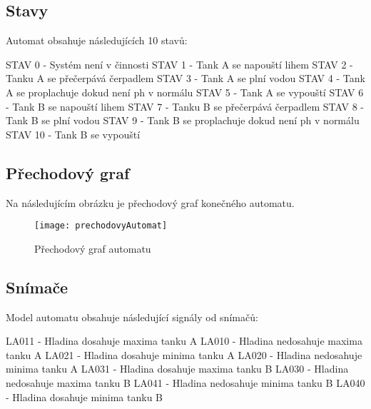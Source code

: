 \documentclass[12pt, a4paper]{article}
\begin{document}
\subsection{Stavy}
Automat obsahuje následujících 10 stavů:

STAV 0 - Systém není v činnosti \newline 
STAV 1 - Tank A se napouští lihem \newline 
STAV 2 - Tanku A se přečerpává čerpadlem \newline 
STAV 3 - Tank A se plní vodou \newline 
STAV 4 - Tank A se proplachuje dokud není ph v normálu \newline 
STAV 5 - Tank A se vypouští \newline 
STAV 6 - Tank B se napouští lihem \newline 
STAV 7 - Tanku B se přečerpává čerpadlem \newline 
STAV 8 - Tank B se plní vodou \newline 
STAV 9 - Tank B se proplachuje dokud není ph v normálu \newline 
STAV 10 - Tank B se vypouští 

\newpage
\subsection{Přechodový graf}
Na následujícím obrázku je přechodový graf konečného automatu.
\begin{figure}[h]
\centering 
\texttt{[image: prechodovyAutomat]}
\caption{Přechodový graf automatu}
\end{figure}

\subsection{Snímače}
Model automatu obsahuje následující signály od snímačů:
 
LA011 - Hladina dosahuje maxima tanku A \newline 
LA010 - Hladina nedosahuje maxima tanku A \newline 
LA021 - Hladina dosahuje minima tanku A \newline 
LA020 - Hladina nedosahuje minima tanku A \newline 
LA031 - Hladina dosahuje maxima tanku B \newline
LA030 - Hladina nedosahuje maxima tanku B \newline 
LA041 - Hladina nedosahuje minima tanku B \newline 
LA040 - Hladina dosahuje minima tanku B
\end{document}
